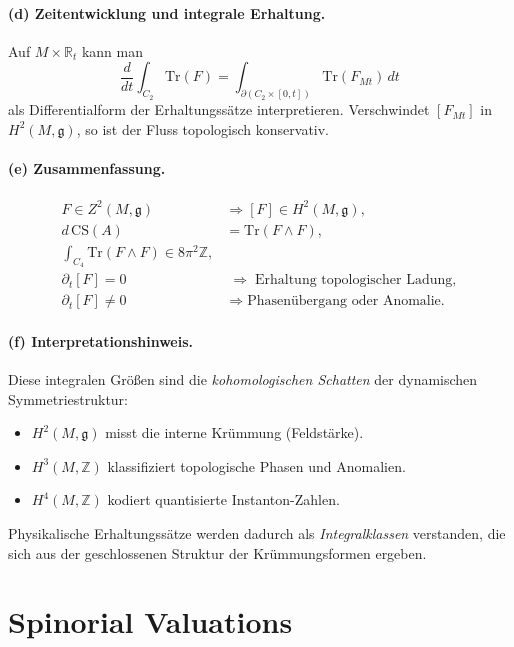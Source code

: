 \documentclass[10pt, letterpaper]{article}
\begin{document}
\paragraph{(d) Zeitentwicklung und integrale Erhaltung.}
Auf $M\times\mathbb R_t$ kann man
\[
\frac{d}{dt}\int_{C_2}\mathrm{Tr}(F)=\int_{\partial(C_2\times[0,t])}\mathrm{Tr}(F_{Mt})\,dt
\]
als Differentialform der Erhaltungssätze interpretieren.
Verschwindet $[F_{Mt}]$ in $H^2(M,\mathfrak g)$,
so ist der Fluss topologisch konservativ.

\paragraph{(e) Zusammenfassung.}
\[
\boxed{
\begin{aligned}
F\in Z^2(M,\mathfrak g)
&\Rightarrow [F]\in H^2(M,\mathfrak g),\\[3pt]
d\,\mathrm{CS}(A)&=\mathrm{Tr}(F\wedge F),\\[3pt]
\int_{C_4}\mathrm{Tr}(F\wedge F)\in 8\pi^2\mathbb Z,\\[3pt]
\partial_t[F]=0 &\;\Rightarrow\; \text{Erhaltung topologischer Ladung},\\[3pt]
\partial_t[F]\neq0 &\;\Rightarrow\; \text{Phasenübergang oder Anomalie.}
\end{aligned}
}
\]

\paragraph{(f) Interpretationshinweis.}
Diese integralen Größen sind die \emph{ko\-homologischen Schatten}
der dynamischen Symmetriestruktur:
\begin{itemize}
\item $H^2(M,\mathfrak g)$ misst die interne Krümmung (Feldstärke).
\item $H^3(M,\mathbb Z)$ klassifiziert topologische Phasen und Anomalien.
\item $H^4(M,\mathbb Z)$ kodiert quantisierte Instanton-Zahlen.
\end{itemize}
Physikalische Erhaltungssätze werden dadurch als
\emph{Integralklassen} verstanden, die sich aus der geschlossenen Struktur
der Krümmungsformen ergeben.








\pagebreak


\section{Spinorial Valuations}
\end{document}
